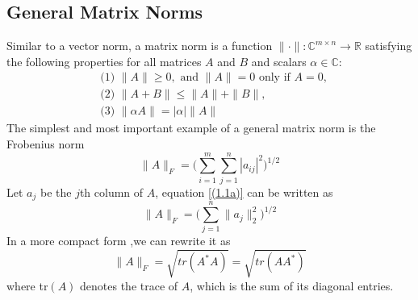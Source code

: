 \documentclass[12pt,gsu,online,openany,singleside,hidelinks]{gsudiss}
\newcommand{\comm}[1]{\added[comment={#1}]{}}
\begin{document}
\subsection{General Matrix Norms}
Similar to a vector norm, a matrix norm is a function  $ \| \cdot \| : \mathbb{C}^{m\times n} \rightarrow \mathbb{R} $ satisfying the following properties for all matrices $A$ and $B$ and scalars $\alpha \in \mathbb{C}$:
\begin{align*}
	&\text{(1) } \| A \| \geq 0, \text{ and } \| A \| = 0 \text{ only if } A = 0,\\
	&\text{(2) } \| A+B \| \leq \| A \| + \| B \|,\\
	&\text{(3) } \| \alpha A \| = |\alpha| \| A \|
\end{align*}
The simplest and most important example of a general matrix norm is the Frobenius norm
\begin{equation}\label{(1.1a)}
	\| A \|_F = \bigg( \sum_{i=1}^{m} \sum_{j=1}^{n} |a_{ij}|^2 \bigg)^{1/2}
\end{equation}
\comm{I suggest removing this section, but this seems like a good place to say that I would suggest you avoid \textbackslash bigg and similar things.  (Although they can be useful if you split equations across lines.)  It is usually easier and better just to let \LaTeX\ size parenthesis, or other delimiters, automatically with \textbackslash left( and \textbackslash right).  You also get a little bit of error checking from \LaTeX\ if you use left and right.}  Let $a_j$ be the $j$th column of $A$, equation \ref{(1.1a)} can be written as
\begin{equation}
	\| A \|_F = \bigg(\sum_{j=1}^{n} \|a_{j}\|_2 ^2 \bigg)^{1/2}
\end{equation}
In a more compact form ,we can rewrite it as
\begin{equation}
	\| A \|_F = \sqrt{tr(A^*A)} = \sqrt{tr(AA^*)}
\end{equation}
where tr$(A)$ denotes the trace of $A$, which is the sum of its diagonal entries.
\end{document}
